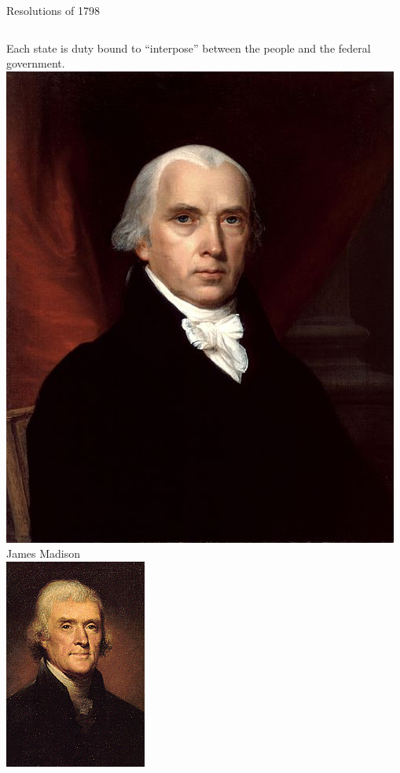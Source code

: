 
\begin{frame}{Resolutions of 1798}
    \begin{columns}[c]
            \Large{Each state is duty bound to ``interpose'' between the people and the federal government.}
        \column{0.5\textheight}
            \centering
            \includegraphics[height=0.4\textheight]{img/madison.jpg} \\
            { \tiny James Madison \\ }
            \includegraphics[height=0.4\textheight]{img/jefferson.png} \\

\end{columns}
\end{frame}
